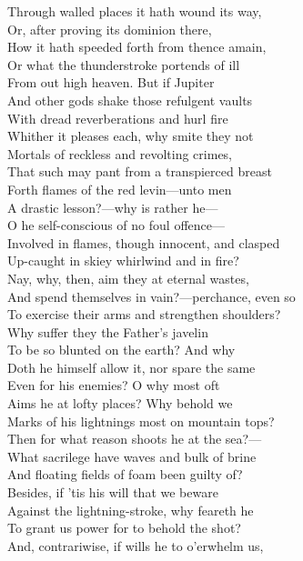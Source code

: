 Through walled places it hath wound its way,\\
Or, after proving its dominion there,\\
How it hath speeded forth from thence amain,\\
Or what the thunderstroke portends of ill\\
From out high heaven. But if Jupiter\\
And other gods shake those refulgent vaults\\
With dread reverberations and hurl fire\\
Whither it pleases each, why smite they not\\
Mortals of reckless and revolting crimes,\\
That such may pant from a transpierced breast\\
Forth flames of the red levin—unto men\\
A drastic lesson?—why is rather he—\\
O he self-conscious of no foul offence—\\
Involved in flames, though innocent, and clasped\\
Up-caught in skiey whirlwind and in fire?\\
Nay, why, then, aim they at eternal wastes,\\
And spend themselves in vain?—perchance, even so\\
To exercise their arms and strengthen shoulders?\\
Why suffer they the Father's javelin\\
To be so blunted on the earth? And why\\
Doth he himself allow it, nor spare the same\\
Even for his enemies? O why most oft\\
Aims he at lofty places? Why behold we\\
Marks of his lightnings most on mountain tops?\\
Then for what reason shoots he at the sea?—\\
What sacrilege have waves and bulk of brine\\
And floating fields of foam been guilty of?\\
Besides, if 'tis his will that we beware\\
Against the lightning-stroke, why feareth he\\
To grant us power for to behold the shot?\\
And, contrariwise, if wills he to o'erwhelm us,\\

